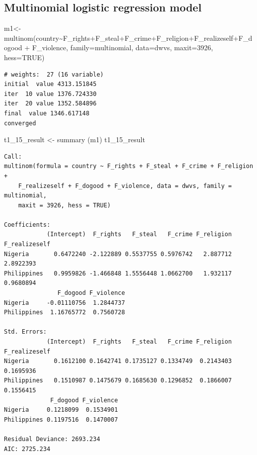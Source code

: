 \documentclass[
  11pt,
]{article}
\newenvironment{Shaded}{\begin{snugshade}}{\end{snugshade}}
\newcommand{\AttributeTok}[1]{\textcolor[rgb]{0.77,0.63,0.00}{#1}}
\newcommand{\ConstantTok}[1]{\textcolor[rgb]{0.00,0.00,0.00}{#1}}
\newcommand{\DecValTok}[1]{\textcolor[rgb]{0.00,0.00,0.81}{#1}}
\newcommand{\FunctionTok}[1]{\textcolor[rgb]{0.00,0.00,0.00}{#1}}
\newcommand{\NormalTok}[1]{#1}
\newcommand{\OtherTok}[1]{\textcolor[rgb]{0.56,0.35,0.01}{#1}}
\newcommand{\SpecialCharTok}[1]{\textcolor[rgb]{0.00,0.00,0.00}{#1}}
\begin{document}
\hypertarget{multinomial-logistic-regression-model}{%
\subsection{Multinomial logistic regression model}\label{multinomial-logistic-regression-model}}

\begin{Shaded}
\begin{Highlighting}[]
\NormalTok{m1}\OtherTok{\textless{}{-}} \FunctionTok{multinom}\NormalTok{(country}\SpecialCharTok{\textasciitilde{}}\NormalTok{F\_rights}\SpecialCharTok{+}\NormalTok{F\_steal}\SpecialCharTok{+}\NormalTok{F\_crime}\SpecialCharTok{+}\NormalTok{F\_religion}\SpecialCharTok{+}\NormalTok{F\_realizeself}\SpecialCharTok{+}\NormalTok{F\_dogood }\SpecialCharTok{+}
\NormalTok{                F\_violence, }\AttributeTok{family=}\NormalTok{multinomial, }\AttributeTok{data=}\NormalTok{dwvs, }\AttributeTok{maxit=}\DecValTok{3926}\NormalTok{, }\AttributeTok{hess=}\ConstantTok{TRUE}\NormalTok{)}
\end{Highlighting}
\end{Shaded}

\begin{verbatim}
# weights:  27 (16 variable)
initial  value 4313.151845 
iter  10 value 1376.724330
iter  20 value 1352.584896
final  value 1346.617148 
converged
\end{verbatim}

\begin{Shaded}
\begin{Highlighting}[]
\NormalTok{t1\_15\_result }\OtherTok{\textless{}{-}} \FunctionTok{summary}\NormalTok{ (m1)}
\NormalTok{t1\_15\_result}
\end{Highlighting}
\end{Shaded}

\begin{verbatim}
Call:
multinom(formula = country ~ F_rights + F_steal + F_crime + F_religion + 
    F_realizeself + F_dogood + F_violence, data = dwvs, family = multinomial, 
    maxit = 3926, hess = TRUE)

Coefficients:
            (Intercept)  F_rights   F_steal   F_crime F_religion F_realizeself
Nigeria       0.6472240 -2.122889 0.5537755 0.5976742   2.887712     2.8922393
Philippines   0.9959826 -1.466848 1.5556448 1.0662700   1.932117     0.9680894
               F_dogood F_violence
Nigeria     -0.01110756  1.2844737
Philippines  1.16765772  0.7560728

Std. Errors:
            (Intercept)  F_rights   F_steal   F_crime F_religion F_realizeself
Nigeria       0.1612100 0.1642741 0.1735127 0.1334749  0.2143403     0.1695936
Philippines   0.1510987 0.1475679 0.1685630 0.1296852  0.1866007     0.1556415
             F_dogood F_violence
Nigeria     0.1218099  0.1534901
Philippines 0.1197516  0.1470007

Residual Deviance: 2693.234 
AIC: 2725.234 
\end{verbatim}
\end{document}
